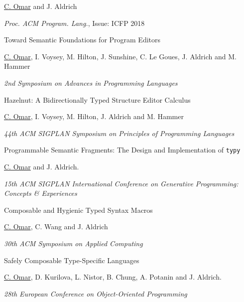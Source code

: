 \documentclass[10pt,letterpaper]{article}
\renewenvironment{itemize}{
  \begin{list}{}{
    \setlength{\leftmargin}{1.25em}
    \setlength{\itemsep}{0.25em}
    \setlength{\parskip}{0pt}
    \setlength{\parsep}{0.2em}
  }
}{
  \end{list}
}
\begin{document}
\begin{enumerate}[leftmargin=*, labelindent=6.5em, font=\bfseries]
        \begin{itemize}
          \item \underline{C. Omar} and J. Aldrich
          \item \textit{Proc. ACM Program. Lang.}, Issue: ICFP 2018
        \end{itemize}
  \item[SNAPL 2018] Toward Semantic Foundations for Program Editors
        \begin{itemize}
          \item \underline{C. Omar}, I. Voysey, M. Hilton, J. Sunshine, C. Le Goues, J. Aldrich and M. Hammer
          \item \textit{2nd Symposium on Advances in Programming Languages} 
        \end{itemize}
  \item[POPL 2017] {Hazelnut: A Bidirectionally Typed Structure Editor Calculus}
        \begin{itemize}
          \item \underline{C. Omar}, I. Voysey, M. Hilton, J. Aldrich and M. Hammer
          \item \textit{44th ACM SIGPLAN Symposium on Principles of Programming Languages} 
        \end{itemize}
  \item[GPCE 2016] {Programmable Semantic Fragments: The Design and Implementation of \texttt{typy}}
        \begin{itemize}
          \item \underline{C. Omar} and J. Aldrich.
          \item \textit{15th ACM SIGPLAN International Conference on Generative Programming: Concepts \& Experiences}
        \end{itemize}
  \item[SAC 2015] Composable and Hygienic Typed Syntax Macros
        \begin{itemize}
          \item \underline{C. Omar}, C. Wang and J. Aldrich
          \item \textit{30th ACM Symposium on Applied Computing}
        \end{itemize}
  \item[ECOOP 2014] {Safely Composable Type-Specific Languages}
        \begin{itemize}
          \item \underline{C. Omar}, D. Kurilova, L. Nistor, B. Chung, A. Potanin and J. Aldrich.
          \item \textit{28th European Conference on Object-Oriented Programming}

\end{itemize}
\end{enumerate}
\end{document}
